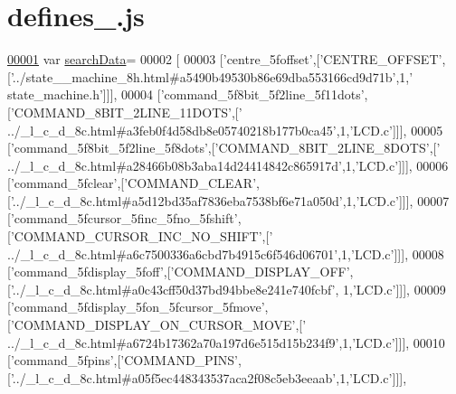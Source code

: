 \hypertarget{defines__2_8js_source}{}\section{defines\+\_.\+js}
\label{defines__2_8js_source}

\begin{DoxyCode}
\hypertarget{defines__2_8js_source.tex_l00001}{}\hyperlink{defines__2_8js_ad01a7523f103d6242ef9b0451861231e}{00001} var \hyperlink{defines__2_8js_ad01a7523f103d6242ef9b0451861231e}{searchData}=
00002 [
00003   [\textcolor{stringliteral}{'centre\_5foffset'},[\textcolor{stringliteral}{'CENTRE\_OFFSET'},[\textcolor{stringliteral}{'../state\_\_machine\_8h.html#a5490b49530b86e69dba553166cd9d71b'},1,\textcolor{stringliteral}{'
      state\_machine.h'}]]],
00004   [\textcolor{stringliteral}{'command\_5f8bit\_5f2line\_5f11dots'},[\textcolor{stringliteral}{'COMMAND\_8BIT\_2LINE\_11DOTS'},[\textcolor{stringliteral}{'
      ../\_l\_c\_d\_8c.html#a3feb0f4d58db8e05740218b177b0ca45'},1,\textcolor{stringliteral}{'LCD.c'}]]],
00005   [\textcolor{stringliteral}{'command\_5f8bit\_5f2line\_5f8dots'},[\textcolor{stringliteral}{'COMMAND\_8BIT\_2LINE\_8DOTS'},[\textcolor{stringliteral}{'
      ../\_l\_c\_d\_8c.html#a28466b08b3aba14d24414842c865917d'},1,\textcolor{stringliteral}{'LCD.c'}]]],
00006   [\textcolor{stringliteral}{'command\_5fclear'},[\textcolor{stringliteral}{'COMMAND\_CLEAR'},[\textcolor{stringliteral}{'../\_l\_c\_d\_8c.html#a5d12bd35af7836eba7538bf6e71a050d'},1,\textcolor{stringliteral}{'LCD.c'}]]],
00007   [\textcolor{stringliteral}{'command\_5fcursor\_5finc\_5fno\_5fshift'},[\textcolor{stringliteral}{'COMMAND\_CURSOR\_INC\_NO\_SHIFT'},[\textcolor{stringliteral}{'
      ../\_l\_c\_d\_8c.html#a6c7500336a6cbd7b4915c6f546d06701'},1,\textcolor{stringliteral}{'LCD.c'}]]],
00008   [\textcolor{stringliteral}{'command\_5fdisplay\_5foff'},[\textcolor{stringliteral}{'COMMAND\_DISPLAY\_OFF'},[\textcolor{stringliteral}{'../\_l\_c\_d\_8c.html#a0c43cff50d37bd94bbe8e241e740fcbf'},
      1,\textcolor{stringliteral}{'LCD.c'}]]],
00009   [\textcolor{stringliteral}{'command\_5fdisplay\_5fon\_5fcursor\_5fmove'},[\textcolor{stringliteral}{'COMMAND\_DISPLAY\_ON\_CURSOR\_MOVE'},[\textcolor{stringliteral}{'
      ../\_l\_c\_d\_8c.html#a6724b17362a70a197d6e515d15b234f9'},1,\textcolor{stringliteral}{'LCD.c'}]]],
00010   [\textcolor{stringliteral}{'command\_5fpins'},[\textcolor{stringliteral}{'COMMAND\_PINS'},[\textcolor{stringliteral}{'../\_l\_c\_d\_8c.html#a05f5ec448343537aca2f08c5eb3eeaab'},1,\textcolor{stringliteral}{'LCD.c'}]]],

\end{DoxyCode}
